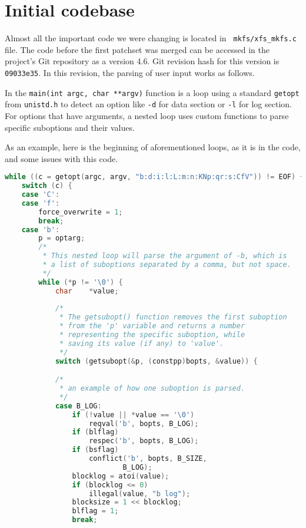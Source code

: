 \section{Initial codebase}\label{chap:refactoring:initialcodebase}

Almost all the important code we were changing is located in {\tt
mkfs/xfs\_mkfs.c} file. The code before the first patchset was merged can
be accessed in the project's Git repository as a version 4.6. Git revision
hash for this version is {\tt 09033e35}. In this revision, the parsing of
user input works as follows.

In the {\tt main(int argc, char **argv)} function is a loop using a standard
{\tt getopt} from {\tt unistd.h} to detect an option like {\tt -d} for data
section or {\tt -l} for log section. For options that have arguments, a
nested loop uses custom functions to parse specific suboptions and their
values.

As an example, here is the beginning of aforementioned loops, as it is in
the code, and some issues with this code.

\begin{lstlisting}[frame=none, basicstyle=\footnotesize\ttfamily,
language=C, numbers=none, numberstyle=\tiny\color{black},
caption= {Part of option-parsing loop from mkfs.xfs with additional
comments.},
label={lst:refactoring:loopexample}]
while ((c = getopt(argc, argv, "b:d:i:l:L:m:n:KNp:qr:s:CfV")) != EOF) {
	switch (c) {
	case 'C':
	case 'f':
		force_overwrite = 1;
		break;
	case 'b':
		p = optarg;
		/*
		 * This nested loop will parse the argument of -b, which is
		 * a list of suboptions separated by a comma, but not space.
		 */
		while (*p != '\0') {
			char	*value;
			
			/*
			 * The getsubopt() function removes the first suboption
			 * from the 'p' variable and returns a number
			 * representing the specific suboption, while
			 * saving its value (if any) to 'value'.
			 */
			switch (getsubopt(&p, (constpp)bopts, &value)) {

			/*
			 * an example of how one suboption is parsed.
			 */
			case B_LOG:
				if (!value || *value == '\0')
					reqval('b', bopts, B_LOG);
				if (blflag)
					respec('b', bopts, B_LOG);
				if (bsflag)
					conflict('b', bopts, B_SIZE,
							B_LOG);
				blocklog = atoi(value);
				if (blocklog <= 0)
					illegal(value, "b log");
				blocksize = 1 << blocklog;
				blflag = 1;
				break;
\end{lstlisting}

